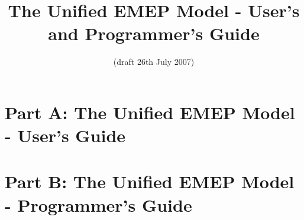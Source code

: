 \documentclass[a4paper,12pt]{report}
\begin{document}
 
\title{The Unified EMEP Model - User's and Programmer's Guide}
\date{(draft 26th July 2007)}
\maketitle

\part{Part A: The Unified EMEP Model - User's Guide}
%
%
%
%


\part{Part B: The Unified EMEP Model - Programmer's Guide}

%
%
%
%
%
%
%
%
%
%
%
%

\end{document}
